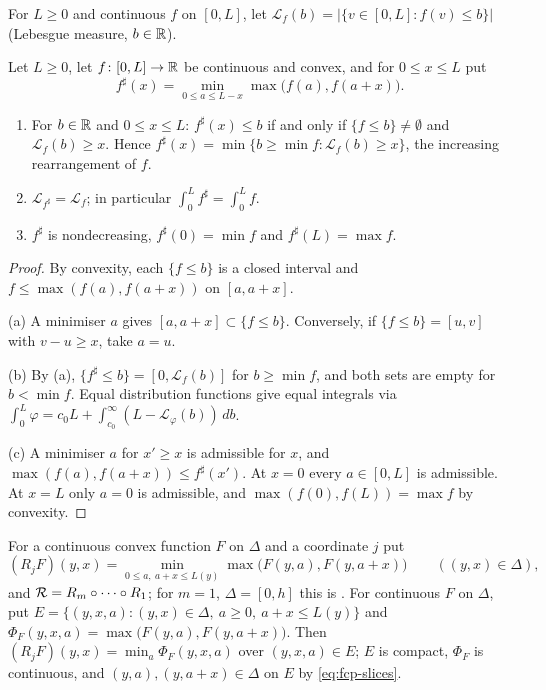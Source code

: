 For $L\ge0$ and continuous $f$ on $[0,L]$, let $\mathcal L_f(b)=\bigl|\{v\in[0,L]:f(v)\le b\}\bigr|$ (Lebesgue measure, $b\in\mathbb{R}$).

\begin{lemma}\label{lem:fcp-interval}
Let $L\ge0$, let $f\colon[0,L]\to\mathbb{R}$ be continuous and convex, and for $0\le x\le L$ put
\[
 f^\sharp(x)=\min_{0\le a\le L-x}\max\bigl(f(a),f(a+x)\bigr).
\]
\begin{enumerate}[label=(\alph*)]
\item For $b\in\mathbb{R}$ and $0\le x\le L$: $f^\sharp(x)\le b$ if and only if $\{f\le b\}\ne\emptyset$ and
 $\mathcal L_f(b)\ge x$. Hence $f^\sharp(x)=\min\{b\ge\min f:\mathcal L_f(b)\ge x\}$, the increasing rearrangement of
 $f$.
\item $\mathcal L_{f^\sharp}=\mathcal L_f$; in particular $\int_0^Lf^\sharp=\int_0^Lf$.
\item $f^\sharp$ is nondecreasing, $f^\sharp(0)=\min f$ and $f^\sharp(L)=\max f$.
\end{enumerate}
\end{lemma}

\begin{proof}
By convexity, each $\{f\le b\}$ is a closed interval and $f\le\max(f(a),f(a+x))$ on $[a,a+x]$.

(a) A minimiser $a$ gives $[a,a+x]\subset\{f\le b\}$. Conversely, if $\{f\le b\}=[u,v]$ with $v-u\ge x$, take $a=u$.

(b) By (a), $\{f^\sharp\le b\}=[0,\mathcal L_f(b)]$ for $b\ge\min f$, and both sets are empty for $b<\min f$. Equal distribution functions give equal integrals via $\int_0^L\varphi=c_0L+\int_{c_0}^\infty(L-\mathcal L_\varphi(b))\,db$.

(c) A minimiser $a$ for $x'\ge x$ is admissible for $x$, and $\max(f(a),f(a+x))\le f^\sharp(x')$. At $x=0$ every $a\in[0,L]$ is admissible. At $x=L$ only $a=0$ is admissible, and $\max(f(0),f(L))=\max f$ by convexity.
\end{proof}

For a continuous convex function $F$ on $\Delta$ and a coordinate $j$ put
\[
 (R_jF)(y,x)=\min_{0\le a,\ a+x\le L(y)}\max\bigl(F(y,a),F(y,a+x)\bigr)\qquad((y,x)\in\Delta),
\]
and $\mathcal{R}=R_m\circ\dots\circ R_1$; for $m=1$, $\Delta=[0,h]$ this is . For continuous $F$ on $\Delta$, put $E=\{(y,x,a):(y,x)\in\Delta,\ a\ge0,\ a+x\le L(y)\}$ and $\Phi_F(y,x,a)=\max\bigl(F(y,a),F(y,a+x)\bigr)$. Then $(R_jF)(y,x)=\min_a\Phi_F(y,x,a)$ over $(y,x,a)\in E$; $E$ is compact, $\Phi_F$ is continuous, and $(y,a),(y,a+x)\in\Delta$ on $E$ by \eqref{eq:fcp-slices}.

